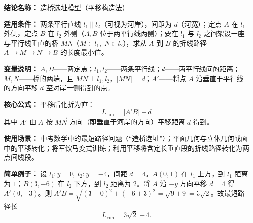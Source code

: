 \textbf{结论名称：} 造桥选址模型（平移构造法）

\textbf{适用条件：} 
两条平行直线 \(l_1 \parallel l_2\)（可视为河岸），间距为 \(d\)（河宽）；定点 \(A\) 在 \(l_1\) 外侧，定点 \(B\) 在 \(l_2\) 外侧（\(A,B\) 位于两平行线两侧）；要在 \(l_1\) 与 \(l_2\) 之间架设一座与平行线垂直的桥 \(MN\)（\(M\in l_1,\;N\in l_2\)），求从 \(A\) 到 \(B\) 的折线路径 \(A \to M \to N \to B\) 的长度最小值。

\textbf{变量说明：} 
\(A,B\)——两定点；\(l_1,l_2\)——两条平行线；\(d\)——两平行线间的距离；\(M,N\)——桥的两端，且 \(MN\perp l_1,l_2\)，\(|MN|=d\)；\(A'\)——将点 \(A\) 沿垂直于平行线的方向平移 \(d\) 至对岸一侧得到的点。

\textbf{核心公式：} 
平移后化折为直：
\[
\boxed{\,L_{\min} = |A'B| + d\,}
\]
其中 \(A'\) 由 \(A\) 按 \(\overrightarrow{MN}\) 方向（即垂直于河岸的方向）平移距离 \(d\) 得到。

\textbf{使用场景：} 
中考数学中的最短路径问题（“造桥选址”）；平面几何与立体几何截面中的平移转化；将军饮马变式训练；利用平移将含定长垂直段的折线路径转化为两点间线段。

\textbf{简单例子：} 
设 \(l_1:y=0,\;l_2:y=-4\)，间距 \(d=4\)。\(A(0,1)\) 在 \(l_1\) 上方，到 \(l_1\) 距离为 \(1\)；\(B(3,-6)\) 在 \(l_2\) 下方，到 \(l_2\) 距离为 \(2\)。将 \(A\) 沿 \(-y\) 方向平移 \(d=4\) 得 \(A'(0,-3)\)。则 \(A'B = \sqrt{(3-0)^2 + (-6+3)^2} = \sqrt{9+9}=3\sqrt{2}\)。故最短路径长
\[
L_{\min} = 3\sqrt{2} + 4.
\]
